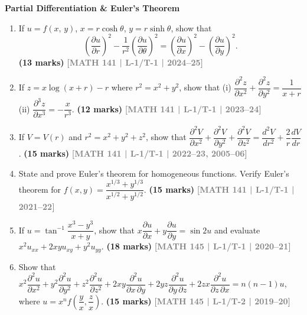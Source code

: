 \documentclass[12pt,a3paper]{article}
\newcommand{\yr}[1]{\hfill\textcolor{gray}{\small\textbf{[#1]}}}
\newcommand{\mk}[1]{\textcolor{orange!70!black}{\small\textbf{(#1 marks)}}}
\newcommand{\subtopic}[2]{%
  \vspace{10pt}
  \noindent\begin{tcolorbox}[colback=#1!8,colframe=#1,boxrule=0.6pt,arc=4pt,
    left=6pt,right=6pt,top=4pt,bottom=4pt]
    \small\bfseries\textcolor{#1}{#2}
  \end{tcolorbox}
  \vspace{2pt}
}
\begin{document}
\subtopic{cA}{Partial Differentiation \& Euler's Theorem}
\label{sub:s1-partial}

\begin{enumerate}
    
\item If $u=f(x,\,y)$, $x=r\cosh\theta$, $y=r\sinh\theta$, show that
    \[
      \left(\frac{\partial u}{\partial r}\right)^{2}
      -\frac{1}{r^{2}}\left(\frac{\partial u}{\partial\theta}\right)^{2}
      =\left(\frac{\partial u}{\partial x}\right)^{2}
      -\left(\frac{\partial u}{\partial y}\right)^{2}.
    \]\mk{13} \yr{MATH 141 | L-1/T-1 | 2024--25}

    

\item If $z=x\log(x+r)-r$ where $r^{2}=x^{2}+y^{2}$, show that (i) $\dfrac{\partial^{2}z}{\partial x^{2}}+\dfrac{\partial^{2}z}{\partial y^{2}}=\dfrac{1}{x+r}$ \quad (ii) $\dfrac{\partial^{3}z}{\partial x^{3}}=-\dfrac{x}{r^{3}}$.
\mk{12} \yr{MATH 141 | L-1/T-1 | 2023--24}

\item If $V=V(r)$ and $r^{2}=x^{2}+y^{2}+z^{2}$, show that $\dfrac{\partial^{2}V}{\partial x^{2}}+\dfrac{\partial^{2}V}{\partial y^{2}}+\dfrac{\partial^{2}V}{\partial z^{2}}=\dfrac{d^{2}V}{dr^{2}}+\dfrac{2}{r}\dfrac{dV}{dr}$.
\mk{15} \yr{MATH 141 | L-1/T-1 | 2022--23, 2005--06}



\item State and prove Euler's theorem for homogeneous functions. Verify Euler's theorem for $f(x,y)=\dfrac{x^{1/3}+y^{1/3}}{x^{1/2}+y^{1/2}}$.
\mk{15} \yr{MATH 141 | L-1/T-1 | 2021--22}

\item If $u=\tan^{-1}\!\dfrac{x^{3}-y^{3}}{x+y}$, show that $x\dfrac{\partial u}{\partial x}+y\dfrac{\partial u}{\partial y}=\sin 2u$ and evaluate $x^{2}u_{xx}+2xyu_{xy}+y^{2}u_{yy}$.
\mk{18} \yr{MATH 145 | L-1/T-1 | 2020--21}

\item Show that $x^{2}\dfrac{\partial^{2}u}{\partial x^{2}}+y^{2}\dfrac{\partial^{2}u}{\partial y^{2}}+z^{2}\dfrac{\partial^{2}u}{\partial z^{2}}+2xy\dfrac{\partial^{2}u}{\partial x\,\partial y}+2yz\dfrac{\partial^{2}u}{\partial y\,\partial z}+2zx\dfrac{\partial^{2}u}{\partial z\,\partial x}=n(n-1)u$, where $u=x^{n}f\!\left(\dfrac{y}{x},\dfrac{z}{x}\right)$.
\mk{15} \yr{MATH 145 | L-1/T-2 | 2019--20}


\end{enumerate}
\end{document}
